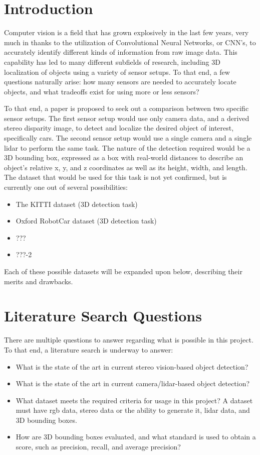 \section{Introduction}
Computer vision is a field that has grown explosively in the last few years, very much in thanks to the utilization of Convolutional Neural Networks, or CNN's, to accurately identify different kinds of information from raw image data. This capability has led to many different subfields of research, including 3D localization of objects using a variety of sensor setups. To that end, a few questions naturally arise: how many sensors are needed to accurately locate objects, and what tradeoffs exist for using more or less sensors?

To that end, a paper is proposed to seek out a comparison between two specific sensor setups. The first sensor setup would use only camera data, and a derived stereo disparity image, to detect and localize the desired object of interest, specifically cars. The second sensor setup would use a single camera and a single lidar to perform the same task. The nature of the detection required would be a 3D bounding box, expressed as a box with real-world distances to describe an object's relative x, y, and z coordinates as well as its height, width, and length. The dataset that would be used for this task is not yet confirmed, but is currently one out of several possibilities:

\begin{itemize} \itemsep=-0.5em
\item The KITTI dataset (3D detection task)
\item Oxford RobotCar dataset (3D detection task)
\item ???
\item ???-2
\end{itemize}
Each of these possible datasets will be expanded upon below, describing their merits and drawbacks.


\section{Literature Search Questions}
There are multiple questions to answer regarding what is possible in this project. To that end, a literature search is underway to answer:

\begin{itemize} \itemsep=-0.5em
\item What is the state of the art in current stereo vision-based object detection?
\item What is the state of the art in current camera/lidar-based object detection?
\item What dataset meets the required criteria for usage in this project? A dataset must have rgb data, stereo data or the ability to generate it, lidar data, and 3D bounding boxes.
\item How are 3D bounding boxes evaluated, and what standard is used to obtain a score, such as precision, recall, and average precision?
\end{itemize}

